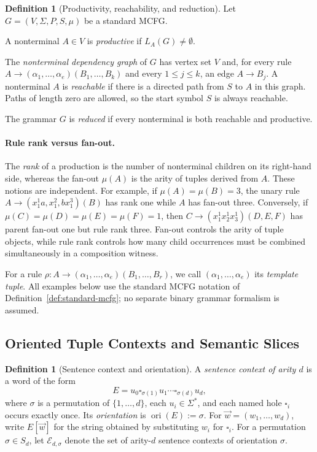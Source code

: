 \documentclass[11pt,a4paper]{article}
\numberwithin{equation}{section}
\theoremstyle{plain}
\theoremstyle{definition}
\newtheorem{definition}[theorem]{Definition}
\theoremstyle{remark}
\newcommand{\tuple}[1]{\vec{#1}}
\newcommand{\blank}{\square}
\begin{document}
\begin{definition}[Productivity, reachability, and reduction]
\label{def:productive-reachable-reduced}
Let \(G=(V,\Sigma,P,S,\mu)\) be a standard MCFG.

A nonterminal \(A\in V\) is \emph{productive} if
\(L_A(G)\ne\emptyset\).

The \emph{nonterminal dependency graph} of \(G\) has vertex set \(V\) and,
for every rule
\(A\to(\alpha_1,\ldots,\alpha_e)(B_1,\ldots,B_k)\)
and every \(1\le j\le k\), an edge \(A\to B_j\).
A nonterminal \(A\) is \emph{reachable} if there is a directed path from
\(S\) to \(A\) in this graph.  Paths of length zero are allowed, so the start
symbol \(S\) is always reachable.

The grammar \(G\) is \emph{reduced} if every nonterminal is both reachable
and productive.
\end{definition}

\paragraph{Rule rank versus fan-out.}
The \emph{rank} of a production is the number of nonterminal children on its
right-hand side, whereas the fan-out \(\mu(A)\) is the arity of tuples derived
from \(A\).  These notions are independent.  For example, if
\(\mu(A)=\mu(B)=3\), the unary rule
\(A\to(x_1^1a,x_1^2,bx_1^3)(B)\) has rank one while \(A\) has fan-out three.
Conversely, if \(\mu(C)=\mu(D)=\mu(E)=\mu(F)=1\), then
\(C\to(x_1^1x_2^1x_3^1)(D,E,F)\) has parent fan-out one but rule rank three.
Fan-out controls the arity of tuple objects, while rule rank controls how many
child occurrences must be combined simultaneously in a composition witness.

For a rule
\(\rho:A\to(\alpha_1,\ldots,\alpha_e)(B_1,\ldots,B_r)\), we call
\((\alpha_1,\ldots,\alpha_e)\) its \emph{template tuple}.  All examples below
use the standard MCFG notation of Definition~\ref{def:standard-mcfg}; no
separate binary grammar formalism is assumed.

\subsection{Oriented Tuple Contexts and Semantic Slices}

\begin{definition}[Sentence context and orientation]
\label{def:sentence-context}
A \emph{sentence context of arity \(d\)} is a word of the form
\[
  E=u_0\blank_{\sigma(1)}u_1\cdots\blank_{\sigma(d)}u_d,
\]
where \(\sigma\) is a permutation of \(\{1,\ldots,d\}\), each
\(u_i\in\Sigma^*\), and each named hole \(\blank_i\) occurs exactly once.
Its \emph{orientation} is
\(\operatorname{ori}(E):=\sigma\).
For \(\tuple w=(w_1,\ldots,w_d)\), write \(E[\tuple w]\) for the string
obtained by substituting \(w_i\) for \(\blank_i\).
For a permutation \(\sigma\in S_d\), let \(\mathcal E_{d,\sigma}\) denote
the set of arity-\(d\) sentence contexts of orientation \(\sigma\).
\end{definition}
\end{document}
